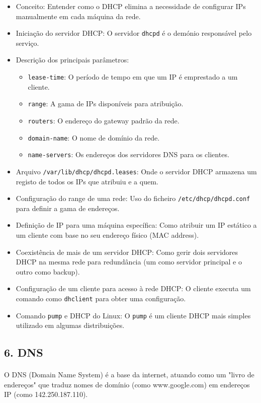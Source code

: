 \documentclass[10pt,a4paper]{article}
\begin{document}
		\begin{itemize}
			\item Conceito: Entender como o DHCP elimina a necessidade de configurar IPs manualmente em cada máquina da rede.
			\item Iniciação do servidor DHCP: O servidor \texttt{dhcpd} é o demónio responsável pelo serviço.
			\item Descrição dos principais parâmetros:
			\begin{itemize}
				\item \texttt{lease-time}: O período de tempo em que um IP é emprestado a um cliente.
				\item \texttt{range}: A gama de IPs disponíveis para atribuição.
				\item \texttt{routers}: O endereço do gateway padrão da rede.
				\item \texttt{domain-name}: O nome de domínio da rede.
				\item \texttt{name-servers}: Os endereços dos servidores DNS para os clientes.
			\end{itemize}
			\item Arquivo \texttt{/var/lib/dhcp/dhcpd.leases}: Onde o servidor DHCP armazena um registo de todos os IPs que atribuiu e a quem.
			\item Configuração do range de uma rede: Uso do ficheiro \texttt{/etc/dhcp/dhcpd.conf} para definir a gama de endereços.
			\item Definição de IP para uma máquina específica: Como atribuir um IP estático a um cliente com base no seu endereço físico (MAC address).
			\item Coexistência de mais de um servidor DHCP: Como gerir dois servidores DHCP na mesma rede para redundância (um como servidor principal e o outro como backup).
			\item Configuração de um cliente para acesso à rede DHCP: O cliente executa um comando como \texttt{dhclient} para obter uma configuração.
			\item Comando \texttt{pump} e DHCP do Linux: O \texttt{pump} é um cliente DHCP mais simples utilizado em algumas distribuições.
		\end{itemize}
		
		\subsection*{6. DNS}
		\vspace{-1.2em}
		\paragraph{}
		O DNS (Domain Name System) é a base da internet, atuando como um "livro de endereços" que traduz nomes de domínio (como www.google.com) em endereços IP (como 142.250.187.110).
		
\end{document}
